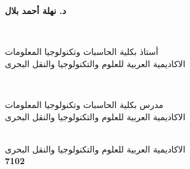\documentclass[12pt,openany]{llncs}
\begin{document}
\begin{titlepage}
{\begin{minipage}{0.40\textwidth}
{\large \bfseries 
د. نهلة أحمد بلال
}
\end{minipage}
\\[0.1cm] 
\begin{minipage}{0.48\textwidth}
\begin{flushleft}
\center
{
أستاذ بكلية الحاسبات وتكنولوجيا المعلومات
}\\
{
الاكاديمية العربية للعلوم والتكنولوجيا والنقل البحرى
}
\end{flushleft}
\end{minipage}
~
\begin{minipage}{0.48\textwidth}
\begin{flushright}
\center
{
مدرس بكلية الحاسبات وتكنولوجيا المعلومات
}\\
{
الاكاديمية العربية للعلوم والتكنولوجيا والنقل البحرى
}
\end{flushright}
\end{minipage}\\[0.5cm]
{
 الاكاديمية العربية للعلوم والتكنولوجيا والنقل البحرى
}\\[0.1cm] 
{\bfseries
 7102
}\\[0cm]


\vfill %
}

\clearpage\thispagestyle{empty}


\end{titlepage}
\end{document}
